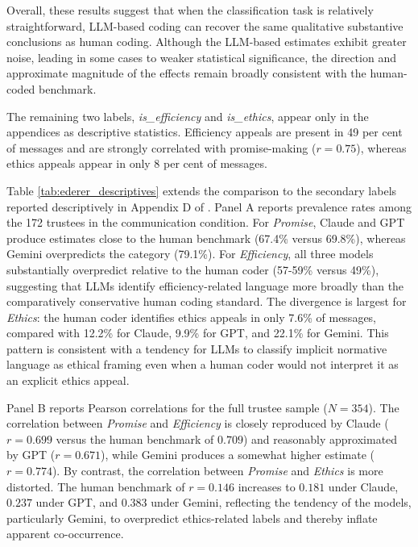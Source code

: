 \documentclass[11pt]{article}
\begin{document}
\begin{sloppypar}


Overall, these results suggest that when the classification task is relatively straightforward, LLM-based coding can recover the same qualitative substantive conclusions as human coding. Although the LLM-based estimates exhibit greater noise, leading in some cases to weaker statistical significance, the direction and approximate magnitude of the effects remain broadly consistent with the human-coded benchmark.

The remaining two labels, \textit{is\_efficiency} and \textit{is\_ethics}, appear only in the appendices as descriptive statistics. Efficiency appeals are present in 49 per cent of messages and are strongly correlated with promise-making ($r = 0.75$), whereas ethics appeals appear in only 8 per cent of messages.

Table \ref{tab:ederer_descriptives} extends the comparison to the secondary labels reported descriptively in Appendix D of \citet{ederer_schneider_2022}. Panel A reports prevalence rates among the 172 trustees in the communication condition. For \textit{Promise}, Claude and GPT produce estimates close to the human benchmark (67.4\% versus 69.8\%), whereas Gemini overpredicts the category (79.1\%). For \textit{Efficiency}, all three models substantially overpredict relative to the human coder (57-59\% versus 49\%), suggesting that LLMs identify efficiency-related language more broadly than the comparatively conservative human coding standard. The divergence is largest for \textit{Ethics}: the human coder identifies ethics appeals in only 7.6\% of messages, compared with 12.2\% for Claude, 9.9\% for GPT, and 22.1\% for Gemini. This pattern is consistent with a tendency for LLMs to classify implicit normative language as ethical framing even when a human coder would not interpret it as an explicit ethics appeal.

Panel B reports Pearson correlations for the full trustee sample ($N = 354$). The correlation between \textit{Promise} and \textit{Efficiency} is closely reproduced by Claude ($r = 0.699$ versus the human benchmark of $0.709$) and reasonably approximated by GPT ($r = 0.671$), while Gemini produces a somewhat higher estimate ($r = 0.774$). By contrast, the correlation between \textit{Promise} and \textit{Ethics} is more distorted. The human benchmark of $r = 0.146$ increases to $0.181$ under Claude, $0.237$ under GPT, and $0.383$ under Gemini, reflecting the tendency of the models, particularly Gemini, to overpredict ethics-related labels and thereby inflate apparent co-occurrence.


\end{sloppypar}
\end{document}
